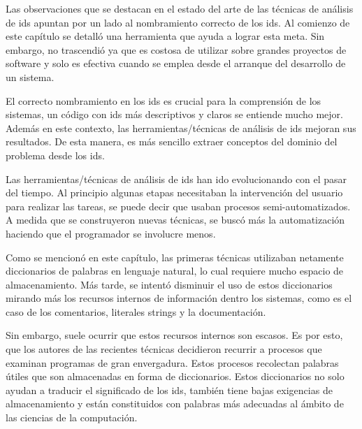 \documentclass[a4paper,12pt]{report}
\begin{document}
Las observaciones que se destacan en el estado del arte de las técnicas de análisis de ids apuntan por un lado al nombramiento correcto de los ids. Al comienzo de este capítulo se detalló una herramienta que ayuda a lograr esta meta. Sin embargo, no trascendió ya que es costosa de utilizar sobre grandes proyectos de software y solo es efectiva cuando se emplea desde el arranque del desarrollo de un sistema.

El correcto nombramiento en los ids es crucial para la comprensión de los sistemas, un código con ids más descriptivos y claros se entiende mucho mejor. Además en este contexto, las herramientas/técnicas de análisis de ids mejoran sus resultados. De esta manera, es más sencillo extraer conceptos del dominio del problema desde los ids.

Las herramientas/técnicas de análisis de ids han ido evolucionando con el pasar del tiempo. Al principio algunas etapas necesitaban la intervención del usuario para realizar las tareas, se puede decir que usaban procesos semi-automatizados. A medida que se construyeron nuevas técnicas, se buscó más la automatización haciendo que el programador se involucre menos.

Como se mencionó en este capítulo, las primeras técnicas utilizaban netamente diccionarios de palabras en lenguaje natural, lo cual requiere mucho espacio de almacenamiento. Más tarde, se intentó disminuir el uso de estos diccionarios mirando más los recursos internos de información dentro los sistemas, como es el caso de los comentarios, literales strings y la documentación.

Sin embargo, suele ocurrir que estos recursos internos son escasos. Es por esto, que los autores de las recientes técnicas decidieron recurrir a procesos que examinan programas de gran envergadura. Estos procesos recolectan palabras útiles que son almacenadas en forma de diccionarios. Estos diccionarios no solo ayudan a traducir el significado de los ids, también tiene bajas exigencias de almacenamiento y están constituidos con palabras más adecuadas al ámbito de las ciencias de la computación.



\end{document}
